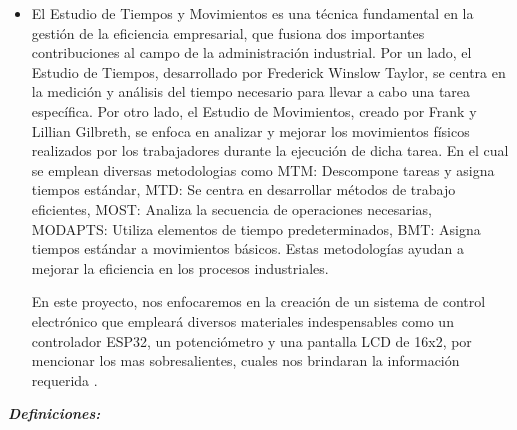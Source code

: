         \begin{itemize}
            \item El Estudio de Tiempos y Movimientos es una técnica fundamental en la gestión de la eficiencia empresarial, que fusiona dos importantes contribuciones al campo de la administración industrial. Por un lado, el Estudio de Tiempos, desarrollado por Frederick Winslow Taylor, se centra en la medición y análisis del tiempo necesario para llevar a cabo una tarea específica. Por otro lado, el Estudio de Movimientos, creado por Frank y Lillian Gilbreth, se enfoca en analizar y mejorar los movimientos físicos realizados por los trabajadores durante la ejecución de dicha tarea. En el cual se emplean diversas metodologias como MTM: Descompone tareas y asigna tiempos estándar, MTD: Se centra en desarrollar métodos de trabajo eficientes, MOST: Analiza la secuencia de operaciones necesarias, MODAPTS: Utiliza elementos de tiempo predeterminados, BMT: Asigna tiempos estándar a movimientos básicos. Estas metodologías ayudan a mejorar la eficiencia en los procesos industriales. 
        
            En este proyecto, nos enfocaremos en la creación de un sistema de control electrónico que empleará diversos materiales indespensables como un controlador ESP32, un potenciómetro y una pantalla LCD de 16x2, por mencionar los mas sobresalientes, cuales nos brindaran la información requerida \cite{Maynards}.
        
        \end{itemize}
    
        \textbf{\textit{Definiciones: }}
        
